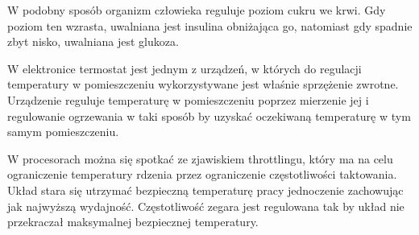 \documentclass{article}
\begin{document}
W podobny sposób organizm człowieka reguluje poziom cukru we krwi. 
Gdy poziom ten wzrasta, uwalniana jest insulina obniżająca go, natomiast gdy spadnie zbyt nisko, uwalniana jest glukoza.

W elektronice termostat jest jednym z urządzeń, w których do regulacji temperatury w pomieszczeniu wykorzystywane jest właśnie sprzężenie zwrotne. 
Urządzenie reguluje temperaturę w pomieszczeniu poprzez mierzenie jej i regulowanie ogrzewania w taki sposób by uzyskać oczekiwaną temperaturę w tym samym pomieszczeniu.

W procesorach można się spotkać ze zjawiskiem throttlingu, który ma na celu ograniczenie temperatury rdzenia przez ograniczenie częstotliwości taktowania. 
Układ stara się utrzymać bezpieczną temperaturę pracy jednoczenie zachowując jak najwyższą wydajność. 
Częstotliwość zegara jest regulowana tak by układ nie przekraczał maksymalnej bezpiecznej temperatury.
\end{document}
